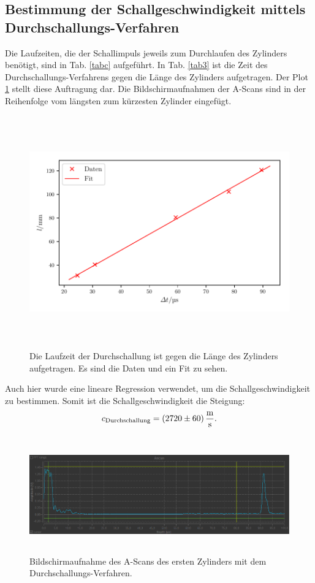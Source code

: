 \subsection{Bestimmung der Schallgeschwindigkeit mittels Durchschallungs-Verfahren}
Die Laufzeiten, die der Schallimpuls jeweils zum Durchlaufen des Zylinders benötigt,
sind in Tab. \ref{tabc} aufgeführt. In Tab. \ref{tab3} ist die Zeit des
Durchschallungs-Verfahrens gegen die Länge des Zylinders aufgetragen.
Der Plot \ref{fig:plot3} stellt diese Auftragung dar.
Die Bildschirmaufnahmen der A-Scans sind in der Reihenfolge vom längsten
zum kürzesten Zylinder eingefügt.


\begin{figure}
    \centering
    \includegraphics[width=15cm, height=10cm]{build/plot3.pdf}
    \caption{Die Laufzeit der Durchschallung ist gegen die Länge des Zylinders
    aufgetragen. Es sind die Daten und ein Fit zu sehen.}
    \label{fig:plot3}
\end{figure}
\noindent Auch hier wurde eine lineare Regression verwendet, um die Schallgeschwindigkeit zu bestimmen. Somit ist die Schallgeschwindigkeit die Steigung:
\begin{equation*}
    c_{\text{Durchschallung}} = \SI{2720 \pm 60}{\meter\per\second}.
\end{equation*}

\begin{figure}
    \centering
    \includegraphics[width=15cm, height=5cm]{build/Messung3.1.png}
    \caption{Bildschirmaufnahme des A-Scans des ersten Zylinders mit dem Durchschallungs-Verfahren.}
    \label{fig:m3.1}
\end{figure}

